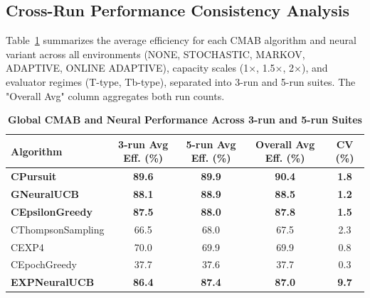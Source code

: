 \documentclass[12pt,a4paper]{article}
\newcommand{\performance}[1]{\textcolor{performancecolor}{\textbf{#1}}}
\newcommand{\legacy}[1]{\textcolor{legacycolor}{\textbf{#1}}}
\newcommand{\neural}[1]{\textcolor{neuralcolor}{\textbf{#1}}}
\begin{document}
\begin{tcolorbox}[colback=performancecolor!10,colframe=performancecolor,title=\textbf{Primary Performance Results (Aggregated Across Capacities, Environments, and Regimes)}]

\subsection{Cross-Run Performance Consistency Analysis}

Table~\ref{tab:global-performance} summarizes the average efficiency for each CMAB algorithm and neural variant across all environments (NONE, STOCHASTIC, MARKOV, ADAPTIVE, ONLINE ADAPTIVE), capacity scales (1$\times$, 1.5$\times$, 2$\times$), and evaluator regimes (T-type, Tb-type), separated into 3-run and 5-run suites. The "Overall Avg" column aggregates both run counts.

\begin{table}[H]
\centering
\caption{\performance{Global CMAB and Neural Performance Across 3-run and 5-run Suites}}
\label{tab:global-performance}
\begin{tabular}{|l|c|c|c|c|}
\hline
\textbf{Algorithm} & \textbf{3-run Avg Eff. (\%)} & \textbf{5-run Avg Eff. (\%)} & \textbf{Overall Avg Eff. (\%)} & \textbf{CV (\%)} \\
\hline
\hline
\performance{CPursuit}        & \performance{89.6} & \performance{89.9} & \performance{\textbf{90.4}} & \performance{1.8} \\
\neural{GNeuralUCB}          & \neural{88.1} & \neural{88.9} & \neural{\textbf{88.5}} & \neural{1.2} \\
\performance{CEpsilonGreedy} & \performance{87.5} & \performance{88.0} & \performance{\textbf{87.8}} & \performance{1.5} \\
CThompsonSampling            & 66.5              & 68.0              & 67.5 & 2.3 \\
CEXP4                        & 70.0              & 69.9              & 69.9 & 0.8 \\
CEpochGreedy                 & 37.7              & 37.6              & 37.7 & 0.3 \\
\legacy{EXPNeuralUCB}        & \legacy{86.4}     & \legacy{87.4}     & \legacy{87.0} & \legacy{9.7} \\
\hline
\end{tabular}
\end{table}


\end{tcolorbox}
\end{document}
